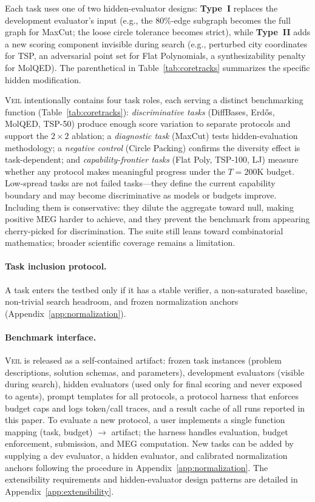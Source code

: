 \documentclass{article}
\begin{document}
Each task uses one of two hidden-evaluator designs: \textbf{Type~I} replaces the development evaluator's input (e.g., the 80\%-edge subgraph becomes the full graph for MaxCut; the loose circle tolerance becomes strict), while \textbf{Type~II} adds a new scoring component invisible during search (e.g., perturbed city coordinates for TSP, an adversarial point set for Flat Polynomials, a synthesizability penalty for MolQED). The parenthetical in Table~\ref{tab:coretracks} summarizes the specific hidden modification.

\textsc{Veil} intentionally contains four task roles, each serving a distinct benchmarking function (Table~\ref{tab:coretracks}): \emph{discriminative tasks} (DiffBases, Erd\H{o}s, MolQED, TSP-50) produce enough score variation to separate protocols and support the $2{\times}2$ ablation; a \emph{diagnostic task} (MaxCut) tests hidden-evaluation methodology; a \emph{negative control} (Circle Packing) confirms the diversity effect is task-dependent; and \emph{capability-frontier tasks} (Flat Poly, TSP-100, LJ) measure whether any protocol makes meaningful progress under the $T{=}200$K budget. Low-spread tasks are not failed tasks---they define the current capability boundary and may become discriminative as models or budgets improve. Including them is conservative: they dilute the aggregate toward null, making positive MEG harder to achieve, and they prevent the benchmark from appearing cherry-picked for discrimination. The suite still leans toward combinatorial mathematics; broader scientific coverage remains a limitation.

\paragraph{Task inclusion protocol.}
A task enters the testbed only if it has a stable verifier, a non-saturated baseline, non-trivial search headroom, and frozen normalization anchors (Appendix~\ref{app:normalization}).

\paragraph{Benchmark interface.}
\textsc{Veil} is released as a self-contained artifact: frozen task instances (problem descriptions, solution schemas, and parameters), development evaluators (visible during search), hidden evaluators (used only for final scoring and never exposed to agents), prompt templates for all protocols, a protocol harness that enforces budget caps and logs token/call traces, and a result cache of all runs reported in this paper. To evaluate a new protocol, a user implements a single function mapping (task, budget) $\to$ artifact; the harness handles evaluation, budget enforcement, submission, and MEG computation. New tasks can be added by supplying a dev evaluator, a hidden evaluator, and calibrated normalization anchors following the procedure in Appendix~\ref{app:normalization}. The extensibility requirements and hidden-evaluator design patterns are detailed in Appendix~\ref{app:extensibility}.
\end{document}
